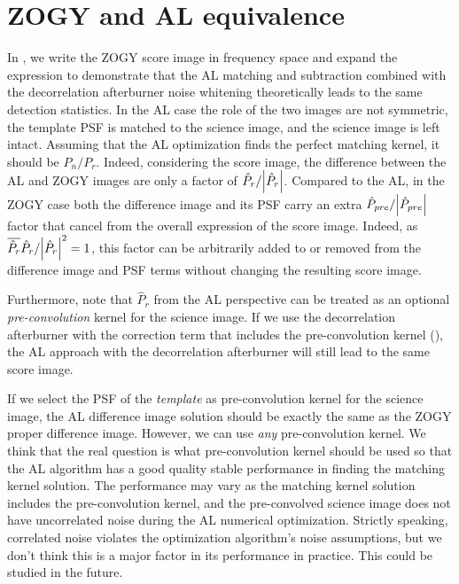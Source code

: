 \section{ZOGY and AL equivalence\label{sec:ALZOGYequiv}}
%
\par In , we write the ZOGY score image in frequency
space and expand the expression to demonstrate that the AL matching
and subtraction combined with the decorrelation afterburner noise
whitening theoretically leads to the same detection statistics.  In the
AL case the role of the two images are not symmetric, the template PSF
is matched to the science image, and the science image is left
intact. Assuming that the AL optimization finds the perfect matching
kernel, it should be \(P_n/P_r\).  Indeed, considering the score
image, the difference between the AL and ZOGY images are only a factor
of \(\hat{P}_r/\abs{\hat{P}_r}\). Compared to the AL, in the ZOGY case
both the difference image and its PSF carry an extra
\(\hat{P}_{pre}/\abs{\hat{P}_{pre}}\) factor that cancel from the
overall expression of the score image. Indeed, as
\(\overline{\hat{P}_r}\hat{P}_r/\abs{\hat{P}_r}^2 = 1\), this factor
can be arbitrarily added to or removed from the difference image
and PSF terms without changing the resulting score image.
%
\par Furthermore, note that \(\hat{P}_r\) from the AL perspective can
be treated as an optional \emph{pre-convolution} kernel for the
science image. If we use the decorrelation afterburner with the
correction term that includes the pre-convolution kernel
(), the AL approach with the decorrelation
afterburner will still lead to the same score image.
%
\par If we select the PSF of the \emph{template} as pre-convolution
kernel for the science image, the AL difference image solution should
be exactly the same as the ZOGY proper difference image. However, we
can use \emph{any} pre-convolution kernel. We think that the real
question is what pre-convolution kernel should be used so that the AL
algorithm has a good quality stable performance in finding the
matching kernel solution. The performance may vary as the matching
kernel solution includes the pre-convolution kernel, and the
pre-convolved science image does not have uncorrelated noise during
the AL numerical optimization. Strictly speaking, correlated noise
violates the optimization algorithm’s noise assumptions, but we don't think this is a
major factor in its performance in practice. This could be studied in the future.
%
